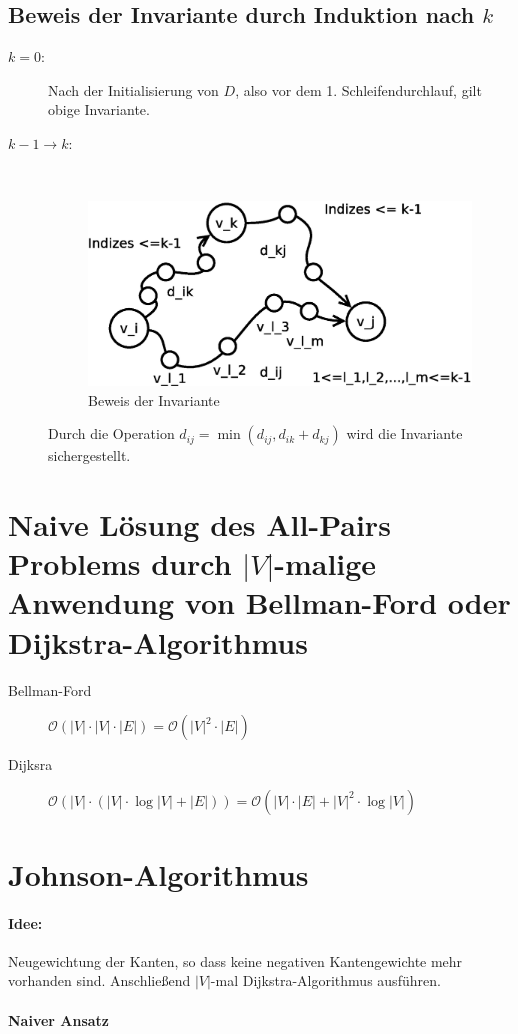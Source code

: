 \subsection{Beweis der Invariante durch Induktion nach $k$}
\begin{description}
\item[$k=0$:] Nach der Initialisierung von $D$, also vor dem 1. Schleifendurchlauf, gilt obige Invariante.
\item[$k-1\rightarrow k$:]$~$\\
\begin{figure}[H]
\centering
\includegraphics[width=0.5\linewidth]{18/Grafik/Diagramm2}
\caption{Beweis der Invariante}
\label{fig:Diagramm2}
\end{figure}
Durch die Operation $d_{ij} = \min(d_{ij}, d_{ik}+d_{kj})$ wird die Invariante sichergestellt.
\end{description}
\section[Naive Lösung]{Naive Lösung des All-Pairs Problems durch $|V|$-malige Anwendung von Bellman-Ford oder Dijkstra-Algorithmus}
\begin{description}
\item[Bellman-Ford] $\mathcal{O}(|V|\cdot|V|\cdot|E|) = \mathcal{O}(|V|^2\cdot|E|)$
\item[Dijksra] $\mathcal{O}(|V|\cdot(|V|\cdot\log|V|+|E|)) = \mathcal{O}(|V|\cdot|E|+|V|^2\cdot\log|V|)$
\end{description}
\section{Johnson-Algorithmus}
\paragraph{Idee:} Neugewichtung der Kanten, so dass keine negativen Kantengewichte mehr vorhanden sind. Anschließend $|V|$-mal Dijkstra-Algorithmus ausführen.

\paragraph{Naiver Ansatz}$~~$\\

